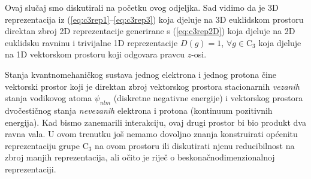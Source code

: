 \begin{primjer} 
Ovaj slučaj smo diskutirali na početku ovog odjeljka. Sad vidimo
da je 3D reprezentacija iz (\ref{eq:c3rep1}--\ref{eq:c3rep3}) koja
djeluje na 3D euklidskom prostoru
direktan zbroj 2D reprezentacije generirane s (\ref{eq:c3rep2D})
koja djeluje na 2D euklidsku ravninu i
trivijalne 1D reprezentacije $D(g) = 1$, $\forall g\in \mathrm{C}_3$
koja djeluje na 1D vektorskom prostoru koji odgovara pravcu $z$-osi.
\end{primjer}


\begin{primjer}
Stanja kvantnomehaničkog sustava jednog elektrona i jednog protona
čine vektorski prostor koji je direktan zbroj
vektorskog prostora stacionarnih \emph{vezanih} stanja vodikovog
atoma $\psi_{nlm}$ (diskretne negativne energije) i vektorskog prostora dvočestičnog stanja
\emph{nevezanih} elektrona i protona (kontinuum pozitivnih energija).
Kad bismo zanemarili interakciju, ovaj drugi prostor bi bio produkt 
dva ravna vala. U ovom trenutku još nemamo dovoljno znanja konstruirati
općenitu reprezentaciju grupe $\mathrm{C}_3$ na ovom prostoru ili diskutirati
njenu reducibilnost na zbroj manjih reprezentacija, ali očito
je riječ o beskonačnodimenzionalnoj reprezentaciji. 
\end{primjer}


